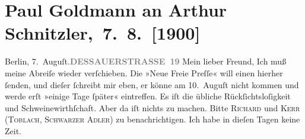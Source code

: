

         
         \renewcommand{\erwaehntePersonen}{Personen:  ?? [Urlaubsvertretung von Paul Goldmann, 2. Augusthälfte 1900], Richard Beer-Hofmann, Georg Brandes, Paul Goldmann, Alfred Kerr}
         \renewcommand{\erwaehnteInstitutionen}{Institutionen: Neue Freie Presse}
         \renewcommand{\erwaehnteOrte}{Orte: Bad Ischl, Berlin, Dessauer Straße, Schwarzer Adler, Toblach}
         \renewcommand{\erwaehnteWerke}{}
               \section[ Paul Goldmann an Arthur Schnitzler, 7. 8. {[}1900{]}]{ Paul Goldmann an Arthur Schnitzler, 7. 8. {[}1900{]}}\nopagebreak{}\rehead{ }\begin{ledgroupsized}[t]{13cm}\normalsize\beginnumbering \toendnotes[C]{\smallbreak\pagebreak[2]} 
\toendnotes[C]{\smallbreak}\pstart
           \noindent{}{\pb}Berlin, 7. Auguſt.\hfill \textcolor{gray}{\textbf{DESSAUERSTRASSE 19}}\pend
           \pstart
           \centering{}Mein lieber Freund,\pend
           \pstart
           \noindent{}Ich muß meine Abreiſe wieder verſchieben. Die »Neue
                  Freie Preſſe« will einen \label{K_L02927-1v}\label{K_L02927-1h}{ }hierher ſenden, und dieſer
               ſchreibt mir eben, er könne am 10. Auguſt nicht kommen
               und werde erſt »einige Tage ſpäter« eintreffen. 
               Es iſt die  übliche Rückſichtsloſigkeit und Schweinewirthſchaft. Aber da iſt nichts zu
               machen. {\pb}Bitte \textsc{Richard} und \textsc{Kerr} (\textsc{Toblach}, \textsc{Schwarzer Adler}) zu benachrichtigen. Ich habe in dieſen Tagen keine Zeit.\pend

\end{ledgroupsized}
